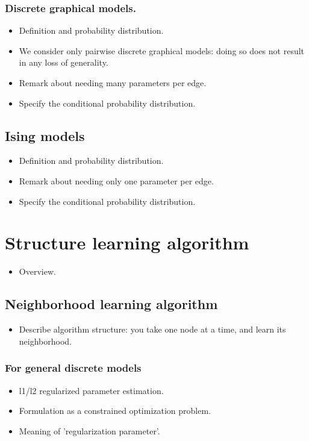 \documentclass{article}
\begin{document}
\subsubsection{Discrete graphical models.}
\begin{itemize}
 \item Definition and probability distribution.
 \item We consider only pairwise discrete graphical models: doing so does not result in any loss of generality. 
 \item Remark about needing many parameters per edge.
 \item Specify the conditional probability distribution.
\end{itemize}

\subsection{Ising models}
\begin{itemize}
 \item Definition and probability distribution.
 \item Remark about needing only one parameter per edge.
 \item Specify the conditional probability distribution.
\end{itemize}

\section{Structure learning algorithm}
\begin{itemize}
 \item Overview.
\end{itemize}

\subsection{Neighborhood learning algorithm}
\begin{itemize}
 \item Describe algorithm structure: you take one node at a time, and learn its neighborhood.
\end{itemize}

\subsubsection{For general discrete models}
\begin{itemize}
 \item l1/l2 regularized parameter estimation.
 \item Formulation as a constrained optimization problem. 
 \item Meaning of 'regularization parameter'.
\end{itemize}
\end{document}
